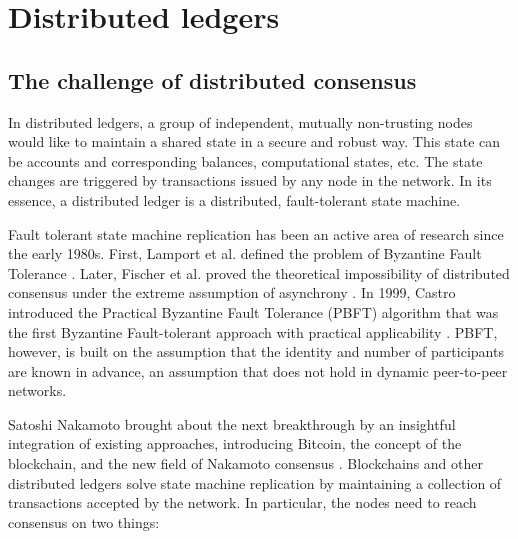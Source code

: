 \documentclass[12pt]{article}
\begin{document}
\section{Distributed ledgers}
\label{sec:ledgers}

\subsection{The challenge of distributed consensus}

In distributed ledgers, a group of independent, mutually non-trusting nodes would like to maintain a shared state in a secure and robust way. This state can be accounts and corresponding balances, computational states, etc. The state changes are triggered by transactions issued by any node in the network. In its essence, a distributed ledger is a distributed, fault-tolerant state machine.

Fault tolerant state machine replication has been an active area of research since the early 1980s. First, Lamport et al. defined the problem of Byzantine Fault Tolerance \cite{Byzantine}. Later, Fischer et al. proved the theoretical impossibility of distributed consensus under the extreme assumption of asynchrony \cite{FLP}. In 1999, Castro introduced the Practical Byzantine Fault Tolerance (PBFT) algorithm that was the first Byzantine Fault-tolerant approach with practical applicability \cite{PBFT}. PBFT, however, is built on the assumption that the identity and number of participants are known in advance, an assumption that does not hold in dynamic peer-to-peer networks.

Satoshi Nakamoto brought about the next breakthrough by an insightful integration of existing approaches, introducing Bitcoin, the concept of the blockchain, and the new field of Nakamoto consensus \cite{Nakamoto2008}. Blockchains and other distributed ledgers solve state machine replication by maintaining a collection of transactions accepted by the network. In particular, the nodes need to reach consensus on two things:
\end{document}
